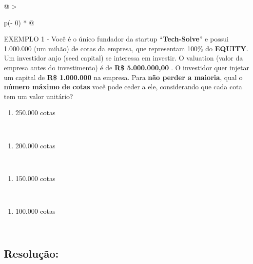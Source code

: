 \documentclass[
]{book}
\providecommand{\tightlist}{%
  \setlength{\itemsep}{0pt}\setlength{\parskip}{0pt}}
\begin{document}
\begin{longtable}[]{@{}
  >{\raggedright\arraybackslash}p{(\columnwidth - 0\tabcolsep) * }@{}}
\toprule\noalign{}
\endhead
\bottomrule\noalign{}
\endlastfoot
EXEMPLO 1 - Você é o único fundador da startup ``\textbf{Tech-Solve}'' e possui 1.000.000 (um mihão) de cotas da empresa, que representam 100\% do \textbf{EQUITY}. Um investidor anjo (seed capital) se interessa em investir. O valuation (valor da empresa antes do investimento) é de \textbf{R\$ 5.000.000,00} . O investidor quer injetar um capital de \textbf{R\$ 1.000.000} na empresa. Para \textbf{não perder a maioria}, qual o \textbf{número máximo de cotas} você pode ceder a ele, considerando que cada cota tem um valor unitário? \\
\begin{minipage}[t]{\linewidth}\raggedright
\begin{enumerate}
\def\labelenumi{\alph{enumi})}
\tightlist
\item
  250.000 cotas
\end{enumerate}
\end{minipage} \\
\begin{minipage}[t]{\linewidth}\raggedright
\begin{enumerate}
\def\labelenumi{\alph{enumi})}
\setcounter{enumi}{1}
\tightlist
\item
  200.000 cotas
\end{enumerate}
\end{minipage} \\
\begin{minipage}[t]{\linewidth}\raggedright
\begin{enumerate}
\def\labelenumi{\alph{enumi})}
\setcounter{enumi}{2}
\tightlist
\item
  150.000 cotas
\end{enumerate}
\end{minipage} \\
\begin{minipage}[t]{\linewidth}\raggedright
\begin{enumerate}
\def\labelenumi{\alph{enumi})}
\setcounter{enumi}{3}
\tightlist
\item
  100.000 cotas
\end{enumerate}
\end{minipage} \\
\end{longtable}

\subsection{Resolução:}\label{resoluuxe7uxe3o}
\end{document}
